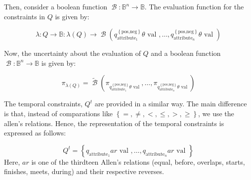 \documentclass{llncs}
\newcommand{\bool}{\operatorname*{\mathcal{B}}}
\newcommand{\Boolean}{\mathbb{B}}
\begin{document}
Then, consider a boolean function $\bool:\Boolean^{n}  \rightarrow \Boolean$. The evaluation function for the constraints in $Q$  is given by:

\begin{equation}
 \label{eq:evaluation-function}
\lambda : Q \rightarrow \Boolean : \lambda (Q) \rightarrow \bool \left(q^{\left \lbrace \mbox{pos,neg} \right \rbrace}_{\mbox{attribute}_1}  \theta \mbox{ val }, \ldots, q^{\left \lbrace \mbox{pos,neg} \right \rbrace}_{\mbox{attribute}_n}  \theta \mbox{ val } \right)
\end{equation}

Now, the uncertainty about the evaluation of $Q$ and a boolean function $\bool:\Boolean^{n}  \rightarrow \Boolean$ is given by:

\begin{equation}
 \label{eq:evaluation-lambda-function}
\pi_{\lambda \left(Q \right)} = \tilde{\bool} \left(\pi_{q^{\left \lbrace \mbox{pos,neg} \right \rbrace}_{\mbox{attribute}_1}  \theta \mbox{ val }}, \ldots, \pi_{q^{\left \lbrace \mbox{pos,neg} \right \rbrace}_{\mbox{attribute}_n}  \theta \mbox{ val }} \right)
\end{equation}


The temporal constraints, $Q^t$ are provided in a similar way. The main difference is that, instead of comparations like $\left \lbrace =, \neq, <, \leq, >, \geq \right \rbrace$, we use the allen's relations. Hence, the representation of the temporal constraints is expressed as follows:

\begin{equation}
\label{eq:temporal-constratins}
Q^{t} = \left \lbrace q_{\mbox{attribute}_1}  ar \mbox{ val }, \ldots, q_{\mbox{attribute}_n}  ar \mbox{ val } \right \rbrace
\end{equation}
Here, $ar$ is one of the thirdteen Allen's relations (equal, before, overlaps, starts, finishes, meets, during) and their respective reverses.
\end{document}
